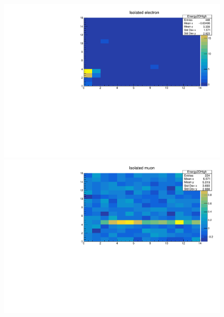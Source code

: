 \begin{figure}
\centering
\begin{minipage}[t]{0.95\textwidth}
\begin{minipage}{0.45\textwidth}
\includegraphics[width=\textwidth]{electronhist.pdf}
\end{minipage}
\begin{minipage}{0.45\textwidth}
\includegraphics[width=\textwidth]{muonhist.pdf}
\end{minipage}
\end{minipage}
\begin{minipage}[b]{0.95\textwidth}
\begin{minipage}{0.45\textwidth}

\end{minipage}
\end{minipage}
\end{figure}
